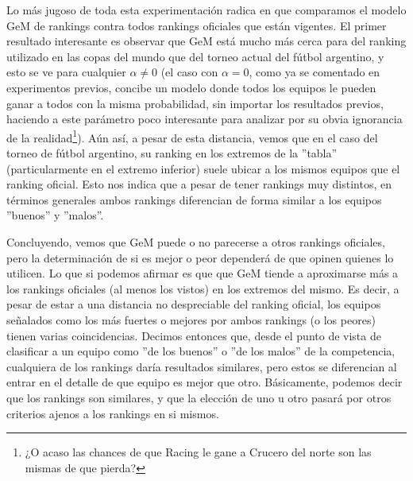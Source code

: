 \par Lo m\'as jugoso de toda esta experimentaci\'on radica en que comparamos el
modelo GeM de rankings contra todos rankings oficiales que est\'an vigentes. El
primer resultado interesante es observar que GeM est\'a mucho m\'as cerca para
del ranking utilizado en las copas del mundo que del torneo actual del f\'utbol
argentino, y esto se ve para cualquier $\alpha\neq 0$ (el caso con $\alpha = 0$,
como ya se comentado en experimentos previos, concibe un modelo donde todos los
equipos le pueden ganar a todos con la misma probabilidad, sin importar los
resultados previos, haciendo a este par\'ametro poco interesante para analizar
por su obvia ignorancia de la realidad\footnote{¿O acaso las chances de que
Racing le gane a Crucero del norte son las mismas de que pierda?}). A\'un as\'i,
a pesar de esta distancia, vemos que en el caso del torneo de f\'utbol
argentino, su ranking en los extremos de la ''tabla'' (particularmente en el
extremo inferior) suele ubicar a los mismos equipos que el ranking oficial. Esto
nos indica que a pesar de tener rankings muy distintos, en t\'erminos generales
ambos rankings diferencian de forma similar a los equipos ''buenos'' y
''malos''.

\par Concluyendo, vemos que GeM puede o no parecerse a otros rankings oficiales,
pero la determinaci\'on de si es mejor o peor depender\'a de que opinen quienes
lo utilicen. Lo que si podemos afirmar es que que GeM tiende a aproximarse m\'as
a los rankings oficiales (al menos los vistos) en los extremos del mismo. Es
decir, a pesar de estar a una distancia no despreciable del ranking oficial, los
equipos se\~nalados como los m\'as fuertes o mejores por ambos rankings (o los
peores) tienen varias coincidencias. Decimos entonces que, desde el punto de
vista de clasificar a un equipo como ''de los buenos'' o ''de los malos'' de la
competencia, cualquiera de los rankings dar\'ia resultados similares, pero estos
se diferencian al entrar en el detalle de que equipo es mejor que otro.
B\'asicamente, podemos decir que los rankings son similares, y que la elecci\'on
de uno u otro pasar\'a por otros criterios ajenos a los rankings en si mismos.
